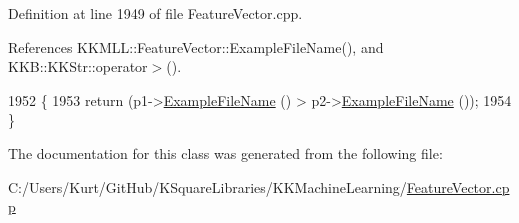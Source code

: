 Definition at line 1949 of file Feature\+Vector.\+cpp.



References K\+K\+M\+L\+L\+::\+Feature\+Vector\+::\+Example\+File\+Name(), and K\+K\+B\+::\+K\+K\+Str\+::operator$>$().


\begin{DoxyCode}
1952   \{
1953     \textcolor{keywordflow}{return}  (p1->\hyperlink{class_k_k_m_l_l_1_1_feature_vector_ab47c89ab1e9396664fdc0dc34b6e1ab5}{ExampleFileName} () > p2->\hyperlink{class_k_k_m_l_l_1_1_feature_vector_ab47c89ab1e9396664fdc0dc34b6e1ab5}{ExampleFileName} ());
1954   \}
\end{DoxyCode}


The documentation for this class was generated from the following file\+:\begin{DoxyCompactItemize}
\item 
C\+:/\+Users/\+Kurt/\+Git\+Hub/\+K\+Square\+Libraries/\+K\+K\+Machine\+Learning/\hyperlink{_feature_vector_8cpp}{Feature\+Vector.\+cpp}\end{DoxyCompactItemize}
